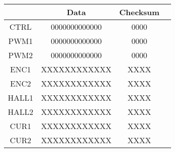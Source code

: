 \begin{table}[h!]
\centering
\begin{tabular}{cccc}
\hline
\multicolumn{1}{|l|}{}       & \multicolumn{1}{c|}{Data}            & \multicolumn{1}{c|}{Checksum} \\ \hline
\multicolumn{1}{|c|}{CTRL}   & \multicolumn{1}{c|}{0000000000000}   & \multicolumn{1}{c|}{0000}     \\ \hline
\multicolumn{1}{|c|}{PWM1}   & \multicolumn{1}{c|}{0000000000000}   & \multicolumn{1}{c|}{0000}     \\ \hline
\multicolumn{1}{|c|}{PWM2}   & \multicolumn{1}{c|}{0000000000000}   & \multicolumn{1}{c|}{0000}     \\ \hline
\multicolumn{1}{|c|}{ENC1}   & \multicolumn{1}{c|}{XXXXXXXXXXXX}    & \multicolumn{1}{c|}{XXXX}     \\ \hline
\multicolumn{1}{|c|}{ENC2}   & \multicolumn{1}{c|}{XXXXXXXXXXXX}    & \multicolumn{1}{c|}{XXXX}     \\ \hline
\multicolumn{1}{|c|}{HALL1}  & \multicolumn{1}{c|}{XXXXXXXXXXXX}    & \multicolumn{1}{c|}{XXXX}     \\ \hline
\multicolumn{1}{|c|}{HALL2}  & \multicolumn{1}{c|}{XXXXXXXXXXXX}    & \multicolumn{1}{c|}{XXXX}     \\ \hline
\multicolumn{1}{|c|}{CUR1}   & \multicolumn{1}{c|}{XXXXXXXXXXXX}    & \multicolumn{1}{c|}{XXXX}     \\ \hline
\multicolumn{1}{|c|}{CUR2}   & \multicolumn{1}{c|}{XXXXXXXXXXXX}    & \multicolumn{1}{c|}{XXXX}     \\ \hline
\end{tabular}
\end{table}